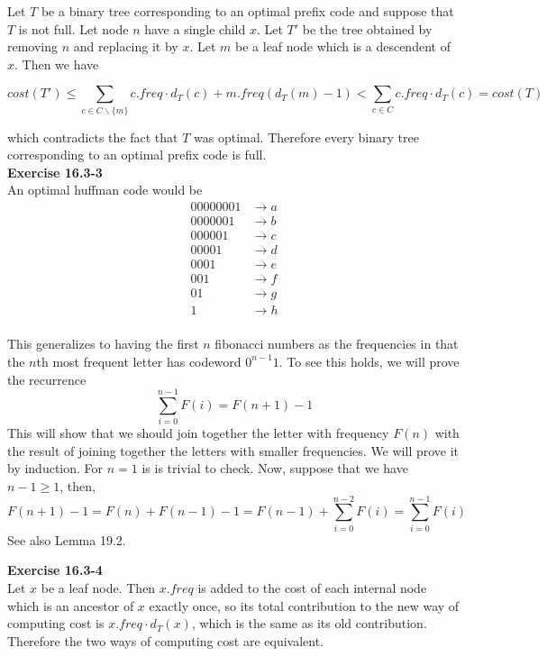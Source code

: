 \documentclass{article}
\begin{document}
Let $T$ be a binary tree corresponding to an optimal prefix code and suppose that $T$ is not full.  Let node $n$ have a single child $x$.  Let $T'$ be the tree obtained by removing $n$ and replacing it by $x$.  Let $m$ be a leaf node which is a descendent of $x$.  Then we have

\[ cost(T') \leq \sum_{c \in C \backslash \{m\} } c.freq \cdot d_{T}(c) + m.freq(d_T(m) - 1) < \sum_{c \in C} c.freq \cdot d_{T}(c) = cost(T)\]

which contradicts the fact that $T$ was optimal.  Therefore every binary tree corresponding to an optimal prefix code is full.\\


\noindent\textbf{Exercise 16.3-3}\\

An optimal huffman code would be 
\begin{align*}
00000001 &\rightarrow a\\
0000001 &\rightarrow b\\
000001 &\rightarrow c\\
00001 &\rightarrow d\\
0001 &\rightarrow e\\
001 &\rightarrow f\\
01 &\rightarrow g\\
1 &\rightarrow h\\
\end{align*}

This generalizes to having the first $n$ fibonacci numbers as the frequencies in that the $n$th most frequent letter has codeword $0^{n-1}1$. To see this holds, we will prove the recurrence 
\[
\sum_{i=0}^{n-1} F(i) = F(n+1)-1
\]
This will show that we should join together the letter with frequency $F(n)$ with the result of joining together the letters with smaller frequencies. We will prove it by induction. For $n=1$ is is trivial to check. Now, suppose that we have $n-1\ge1$, then, 
\[
F(n+1) - 1 = F(n) + F(n-1) -1 = F(n-1) + \sum_{i=0}^{n-2} F(i) = \sum_{i=0}^{n-1} F(i)
\]
See also Lemma 19.2.

\noindent\textbf{Exercise 16.3-4}\\

Let $x$ be a leaf node.  Then $x.freq$ is added to the cost of each internal node which is an ancestor of $x$ exactly once, so its total contribution to the new way of computing cost is $x.freq\cdot d_T(x)$, which is the same as its old contribution.  Therefore the two ways of computing cost are equivalent. \\
\end{document}
